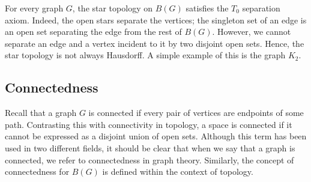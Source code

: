\documentclass{amsart}
\theoremstyle{definition}
\theoremstyle{remark}
\numberwithin{equation}{section}
\begin{document}
	For every graph \(G\), the star topology on \(B(G)\) satisfies the $T_0$ separation axiom. Indeed,
	the open stars separate the vertices; the singleton set of an edge is an open set separating the
	edge from the rest of \(B(G)\). However, we cannot separate an edge and a vertex incident to it by
	two disjoint open sets. Hence, the star topology is not always Hausdorff. A simple example of this is the graph \(K_2\).
	
	\subsection{Connectedness}
	
	Recall that a graph \( G \) is connected if every pair of vertices are endpoints of some path. Contrasting this with connectivity in topology, a space is connected if it
	cannot be expressed as a disjoint union of open sets. Although this term has been used in two different fields, it should be clear that when we say that a graph is connected, we refer to
	connectedness in graph theory. Similarly, the concept of connectedness for \( B(G) \) is defined within the context of topology.
	
\end{document}
